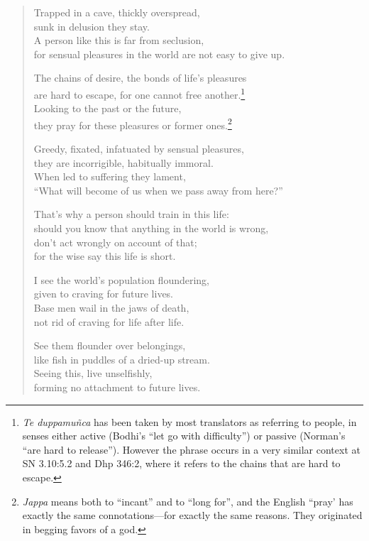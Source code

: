 \documentclass[12pt,openany]{book}%
\begin{document}
\begin{verse}%
Trapped in a cave, thickly overspread, \\
sunk in delusion they stay. \\
A person like this is far from seclusion, \\
for sensual pleasures in the world are not easy to give up. 

The chains of desire, the bonds of life’s pleasures \\
are hard to escape, for one cannot free another.\footnote{\textit{Te \textsanskrit{duppamuñca}} has been taken by most translators as referring to people, in senses either active (Bodhi’s “let go with difficulty”) or passive (Norman’s “are hard to release”). However the phrase occurs in a very similar context at SN 3.10:5.2 and Dhp 346:2, where it refers to the chains that are hard to escape. } \\
Looking to the past or the future, \\
they pray for these pleasures or former ones.\footnote{\textit{Jappa} means both to “incant” and to “long for”, and the English “pray’ has exactly the same connotations—for exactly the same reasons. They originated in begging favors of a god. } 

Greedy, fixated, infatuated by sensual pleasures, \\
they are incorrigible, habitually immoral. \\
When led to suffering they lament, \\
“What will become of us when we pass away from here?” 

That’s why a person should train in this life: \\
should you know that anything in the world is wrong, \\
don’t act wrongly on account of that; \\
for the wise say this life is short. 

I see the world’s population floundering, \\
given to craving for future lives. \\
Base men wail in the jaws of death, \\
not rid of craving for life after life. 

See them flounder over belongings, \\
like fish in puddles of a dried-up stream. \\
Seeing this, live unselfishly, \\
forming no attachment to future lives. 


\end{verse}
\end{document}
